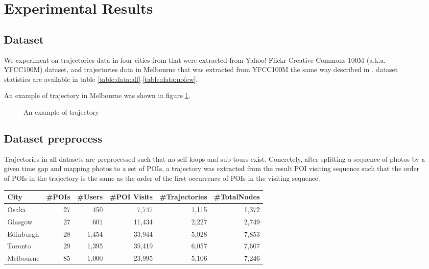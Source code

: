 \section{Experimental Results}
\label{experiment}

\subsection{Dataset}
\label{experiment:dataset}
We experiment on trajectories data in four cities from \cite{ijcai15} that were
extracted from Yahoo! Flickr Creative Commons 100M (a.k.a. YFCC100M) dataset\cite{yfcc100m},
and trajectories data in Melbourne that was extracted from YFCC100M the same way described in \cite{ht10, ijcai15},
dataset statistics are available in table \ref{table:data:all}-\ref{table:data:nofew}.

An example of trajectory in Melbourne was shown in figure \ref{fig:traj}.

\begin{figure}
\centering
{}
\caption{An example of trajectory}
\label{fig:traj}
\end{figure}

\subsection{Dataset preprocess}
\label{experiment:datapreprocess}
Trajectories in all datasets are preprocessed such that no self-loops and sub-tours exist.
Concretely, after splitting a sequence of photos by a given time gap and mapping photos to a set of POIs\cite{ht10, ijcai15},
a trajectory was extracted from the result POI visiting sequence such that the order of POIs in the trajectory is the same as 
the order of the first occurrence of POIs in the visiting sequence.

\begin{table*}
\centering
\caption{Dataset with all trajectories}
\label{table:data:all}
\begin{tabular}{lrrrrr} \hline
\textbf{City} & \textbf{\#POIs} & \textbf{\#Users} & \textbf{\#POI Visits} & \textbf{\#Trajectories} & \textbf{\#TotalNodes} \\ \hline
Osaka & 27 & 450 & 7,747 & 1,115 & 1,372 \\ 
Glasgow & 27 & 601 & 11,434 & 2,227 & 2,749 \\ 
Edinburgh & 28 & 1,454 & 33,944 & 5,028 & 7,853 \\ 
Toronto & 29 & 1,395 & 39,419 & 6,057 & 7,607 \\ 
Melbourne & 85 & 1,000 & 23,995 & 5,106 & 7,246 \\ 
\hline
\end{tabular}
\end{table*}

